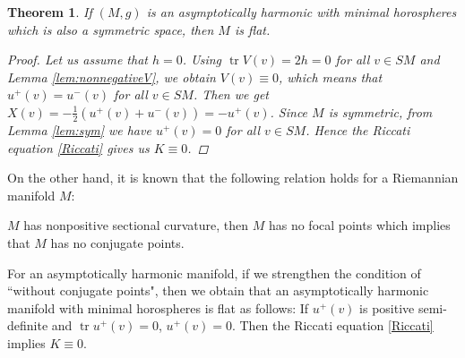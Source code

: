 \documentclass[12pt,a4paper]{amsart}
\newtheorem{Thm}{Theorem}[section]
\theoremstyle{definition}
\theoremstyle{remark}
\newcommand{\id}{\operatorname{id}}
\newcommand{\tr}{\operatorname{tr}}
\newcommand \<{\langle}
\renewcommand \>{\rangle}
\begin{document}
\begin{Thm}
        If $(M,g)$ is an asymptotically harmonic with minimal horospheres {which is also a} symmetric space, then $M$ is flat.


    \begin{proof}
      Let us assume that $h=0$. Using $\tr V(v)= 2h = 0$ for all $v\in SM$ and Lemma \ref{lem:nonnegativeV}, we obtain $V(v)\equiv 0$, which means that
      $u^{+}(v)=u^{-}(v)$ for all $v\in SM$. Then we get $X(v)=-\frac{1}{2}(u^{+}(v)+u^{-}(v))=-u^{+}(v)$. Since $M$ is symmetric, from Lemma \ref{lem:sym} we have $u^{+}(v)=0$ for all $v\in SM$. Hence the Riccati equation \eqref{Riccati} gives us $K\equiv 0$.
    \end{proof}
\end{Thm}

\vspace{0.2in}

{On the other hand, it is known that the following relation holds for a Riemannian manifold $M$:}
{
\begin{center}
    $M$ has nonpositive sectional curvature, then
    $M$ has no focal points which implies that $M$ has no conjugate points.
\end{center} }

For an asymptotically harmonic manifold, if we strengthen the condition
 of ``without conjugate points", then we obtain that an asymptotically harmonic manifold with minimal horospheres is flat as follows: If $u^{+}(v)$ is positive semi-definite and $\tr u^{+}(v)=0$, $u^{+}(v)=0$. Then the Riccati equation \eqref{Riccati} implies $K \equiv 0$.
\end{document}
